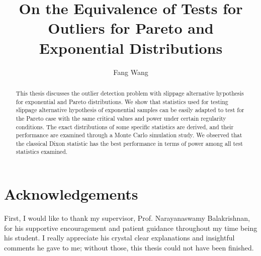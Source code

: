 \documentclass{report}
\author{Fang Wang}
\title{ \textbf{\huge{On the Equivalence of Tests for Outliers for Pareto and Exponential Distributions}}}
\begin{document}
\newcommand{\RR}{\mathbb{R}}
\newcommand{\ZZ}{\mathbb{Z}}
\newcommand{\NN}{\mathbb{N}}
\newcommand{\QQ}{\mathbb{Q}}
\newcommand{\CC}{\mathbb{C}}
\newcommand{\e}{\mathrm{e}}
\newcommand{\sumi}[2][1]{\sum\limits_{i=#1}^{#2}}
\newcommand{\sumk}[2][1]{\sum\limits_{k=#1}^{#2}}
\newcommand{\sumj}[2][1]{\sum\limits_{j=#1}^{#2}}
\newcommand{\sumx}[2][1]{\sum\limits_{x=#1}^{#2}}
\newcommand{\sumn}[2][1]{\sum\limits_{n=#1}^{#2}}
\newcommand{\prodi}[2][1]{\prod\limits_{i=#1}^{#2}}
\newcommand{\prodk}[2][1]{\prod\limits_{k=#1}^{#2}}
\newcommand{\prodj}[2][1]{\prod\limits_{j=#1}^{#2}}
\newcommand{\E}[2][]{ \mathbb{E}_{#1} \left[ #2 \right]}
\newcommand{\Var}[1]{ \mathrm{Var} \left[ #1 \right]}
\newcommand{\Cov}[1]{ \mathrm{Cov} \left[ #1 \right]}
\renewcommand{\P}[2][]{ \mathbb{P}_{#1} \left( #2 \right)}
\newcommand{\iidis}{\stackrel{iid}{\sim}}
\newcommand{\toP}{\stackrel{P}{\to}}
\newcommand{\toD}{\stackrel{\mathrm{D}}{\to}}
\newcommand{\eqD}{\stackrel{\mathrm{D}}{=}}
\newcommand{\toas}{\stackrel{\mathrm{a.s}}{\to}}
\newcommand{\I}[1]{\mathbb 1_{\{#1\}}}
\newtheorem{thm}{Theorem}[chapter]
\newtheorem{prop}{Proposition}[chapter]
\newtheorem{lem}{Lemma}[chapter]
\newtheorem{cor}{Corollary}[chapter]

\theoremstyle{definition}
\newtheorem{defn}{Definition}[chapter]
\newtheorem{eg}{Example}[chapter]

\theoremstyle{remark}
\newtheorem*{rem}{Remark}

\maketitle

\begin{abstract}
    This thesis discusses the outlier detection problem with slippage alternative hypothesis for exponential and Pareto distributions. 
    We show that statistics used for testing slippage alternative hypothesis of exponential samples can be easily adapted to test for the Pareto case with the same critical values and power under certain regularity conditions. 
    The exact distributions of some specific statistics are derived, and their performance are examined through a Monte Carlo simulation study. 
    We observed that the classical Dixon statistic has the best performance in terms of power among all test statistics examined.
\end{abstract}

\section*{Acknowledgements}
First, I would like to thank my supervisor, Prof. Narayanaswamy Balakrishnan, for his supportive encouragement and
patient guidance throughout my time being his student. I really appreciate his crystal clear explanations and insightful comments 
he gave to me; without those, this thesis could not have been finished. 
\end{document}

